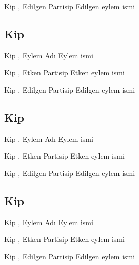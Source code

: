 \begin{kip}{}{Kip , Edilgen Partisip}
  Edilgen eylem ismi
\end{kip}


\subsection*{Kip }

\begin{kip}{}{Kip , Eylem Adı}
  Eylem ismi
\end{kip}

\begin{kip}{}{Kip , Etken Partisip}
  Etken eylem ismi
\end{kip}

\begin{kip}{}{Kip , Edilgen Partisip}
  Edilgen eylem ismi
\end{kip}


\subsection*{Kip }

\begin{kip}{}{Kip , Eylem Adı}
  Eylem ismi
\end{kip}

\begin{kip}{}{Kip , Etken Partisip}
  Etken eylem ismi
\end{kip}

\begin{kip}{}{Kip , Edilgen Partisip}
  Edilgen eylem ismi
\end{kip}

\subsection*{Kip }

\begin{kip}{}{Kip , Eylem Adı}
  Eylem ismi
\end{kip}

\begin{kip}{}{Kip , Etken Partisip}
  Etken eylem ismi
\end{kip}

\begin{kip}{}{Kip , Edilgen Partisip}
  Edilgen eylem ismi
\end{kip}


